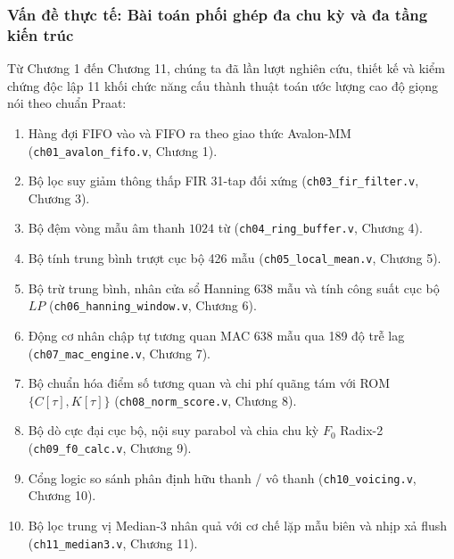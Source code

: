 \subsubsection*{Vấn đề thực tế: Bài toán phối ghép đa chu kỳ và đa tầng kiến trúc}
Từ Chương 1 đến Chương 11, chúng ta đã lần lượt nghiên cứu, thiết kế và kiểm chứng độc lập 11 khối chức năng cấu thành thuật toán ước lượng cao độ giọng nói theo chuẩn Praat:
\begin{enumerate}
    \item Hàng đợi FIFO vào và FIFO ra theo giao thức Avalon-MM (\texttt{ch01\_avalon\_fifo.v}, Chương 1).
    \item Bộ lọc suy giảm thông thấp FIR 31-tap đối xứng (\texttt{ch03\_fir\_filter.v}, Chương 3).
    \item Bộ đệm vòng mẫu âm thanh $1024$ từ (\texttt{ch04\_ring\_buffer.v}, Chương 4).
    \item Bộ tính trung bình trượt cục bộ 426 mẫu (\texttt{ch05\_local\_mean.v}, Chương 5).
    \item Bộ trừ trung bình, nhân cửa sổ Hanning 638 mẫu và tính công suất cục bộ $LP$ (\texttt{ch06\_hanning\_window.v}, Chương 6).
    \item Động cơ nhân chập tự tương quan MAC 638 mẫu qua 189 độ trễ lag (\texttt{ch07\_mac\_engine.v}, Chương 7).
    \item Bộ chuẩn hóa điểm số tương quan và chi phí quãng tám với ROM $\{C[\tau], K[\tau]\}$ (\texttt{ch08\_norm\_score.v}, Chương 8).
    \item Bộ dò cực đại cục bộ, nội suy parabol và chia chu kỳ $F_0$ Radix-2 (\texttt{ch09\_f0\_calc.v}, Chương 9).
    \item Cổng logic so sánh phân định hữu thanh / vô thanh (\texttt{ch10\_voicing.v}, Chương 10).
    \item Bộ lọc trung vị Median-3 nhân quả với cơ chế lặp mẫu biên và nhịp xả flush (\texttt{ch11\_median3.v}, Chương 11).
\end{enumerate}

